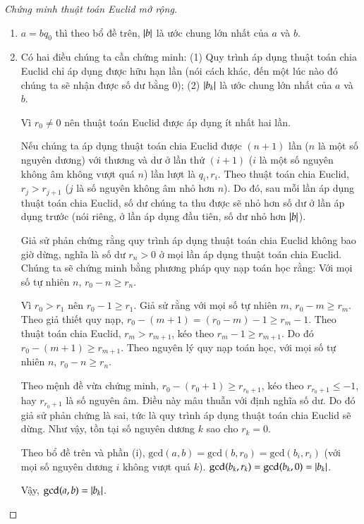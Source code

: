 \begin{proof}[Chứng minh thuật toán Euclid mở rộng]
	\begin{enumerate}[label={(\roman*)}]
		\item $a = b q_{0}$ thì theo bổ đề trên, $\left\vert{b}\right\vert$ là ước chung lớn nhất của $a$ và $b$.

		\item Có hai điều chúng ta cần chứng minh: (1) Quy trình áp dụng thuật toán chia Euclid chỉ áp dụng được hữu hạn lần (nói cách khác, đến một lúc nào đó chúng ta sẽ nhận được số dư bằng $0$); (2) $\left\vert{b_{k}}\right\vert$ là ước chung lớn nhất của $a$ và $b$.

		      Vì $r_{0}\ne 0$ nên thuật toán Euclid được áp dụng ít nhất hai lần.

		      Nếu chúng ta áp dụng thuật toán chia Euclid được $(n+1)$ lần ($n$ là một số nguyên dương) với thương và dư ở lần thứ $(i+1)$ ($i$ là một số nguyên không âm không vượt quá $n$) lần lượt là $q_{i}, r_{i}$. Theo thuật toán chia Euclid, $r_{j} > r_{j+1}$ ($j$ là số nguyên không âm nhỏ hơn $n$). Do đó, sau mỗi lần áp dụng thuật toán chia Euclid, số dư chúng ta thu được sẽ nhỏ hơn số dư ở lần áp dụng trước (nói riêng, ở lần áp dụng đầu tiên, số dư nhỏ hơn $\left\vert{b}\right\vert$).

		      Giả sử phản chứng rằng quy trình áp dụng thuật toán chia Euclid không bao giờ dừng, nghĩa là số dư $r_{n} > 0$ ở mọi lần áp dụng thuật toán chia Euclid. Chúng ta sẽ chứng minh bằng phương pháp quy nạp toán học rằng: Với mọi số tự nhiên $n$, $r_{0} - n\geq r_{n}$.

		      Vì $r_{0} > r_{1}$ nên $r_{0} - 1\geq r_{1}$. Giả sử rằng với mọi số tự nhiên $m$, $r_{0} - m\geq r_{m}$. Theo giả thiết quy nạp, $r_{0} - (m + 1) = (r_{0} - m) - 1 \geq r_{m} - 1$. Theo thuật toán chia Euclid, $r_{m} > r_{m+1}$, kéo theo $r_{m} - 1\geq r_{m+1}$. Do đó $r_{0} - (m + 1)\geq r_{m+1}$. Theo nguyên lý quy nạp toán học, với mọi số tự nhiên $n$, $r_{0} - n\geq r_{n}$.

		      Theo mệnh đề vừa chứng minh, $r_{0} - (r_{0} + 1)\geq r_{r_{0} + 1}$, kéo theo $r_{r_{0} + 1}\leq -1$, hay $r_{r_{0} + 1}$ là số nguyên âm. Điều này mâu thuẫn với định nghĩa số dư. Do đó giả sử phản chứng là sai, tức là quy trình áp dụng thuật toán chia Euclid sẽ dừng. Như vậy, tồn tại số nguyên dương $k$ sao cho $r_{k} = 0$.

		      Theo bổ đề trên và phần (i), $\text{gcd}(a, b) = \text{gcd}(b, r_{0}) = \text{gcd}(b_{i}, r_{i})$ (với mọi số nguyên dương $i$ không vượt quá $k$). $\text{gcd}(b_{k}, r_{k}) = \text{gcd}(b_{k}, 0) = \left\vert{b_{k}}\right\vert$.

		      Vậy, $\text{gcd}(a, b) = \left\vert{b_{k}}\right\vert$.
	\end{enumerate}
\end{proof}

